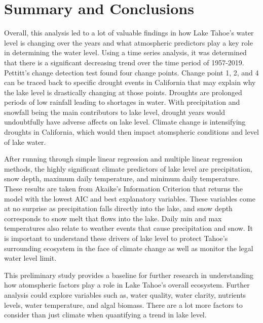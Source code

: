 \documentclass[12pt,]{article}
\begin{document}
\newpage

\hypertarget{summary-and-conclusions}{%
\section{Summary and Conclusions}\label{summary-and-conclusions}}

Overall, this analysis led to a lot of valuable findings in how Lake
Tahoe's water level is changing over the years and what atmospheric
predictors play a key role in determining the water level. Using a time
series analysis, it was determined that there is a significant
decreasing trend over the time period of 1957-2019. Pettitt's change
detection test found four change points. Change point 1, 2, and 4 can be
traced back to specific drought events in California that may explain
why the lake level is drastically changing at those points. Droughts are
prolonged periods of low rainfall leading to shortages in water. With
precipitation and snowfall being the main contributors to lake level,
drought years would undoubtfully have adverse affects on lake level.
Climate change is intensifying droughts in California, which would then
impact atomspheric conditions and level of lake water.

After running through simple linear regression and multiple linear
regression methods, the highly significant climate predictors of lake
level are precipitation, snow depth, maximum daily temperature, and
minimum daily temperature. These results are taken from Akaike's
Information Criterion that returns the model with the lowest AIC and
best explanatory variables. These variables come at no surprise as
precipitation falls directly into the lake, and snow depth corresponds
to snow melt that flows into the lake. Daily min and max temperatures
also relate to weather events that cause precipitation and snow. It is
important to understand these drivers of lake level to protect Tahoe's
surrounding ecosystem in the face of climate change as well as monitor
the legal water level limit.

This preliminary study provides a baseline for further research in
understanding how atomspheric factors play a role in Lake Tahoe's
overall ecosystem. Further analysis could explore variables such as,
water quality, water clarity, nutrients levels, water temperature, and
algal biomass. There are a lot more factors to consider than just
climate when quantifying a trend in lake level.
\end{document}
